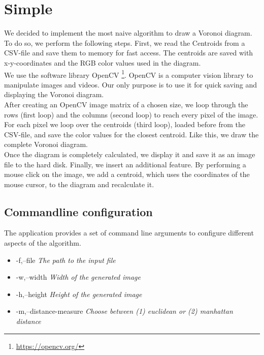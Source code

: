 \section{Simple}

We decided to implement the most naive algorithm to draw a Voronoi diagram.
To do so, we perform the following steps.
First, we read the Centroids from a CSV-file and save them to memory for fast access. The centroids are saved with x-y-coordinates and the RGB color values used in the diagram.\\

We use the software library OpenCV \footnote{\url{https://opencv.org/}}. OpenCV is a computer vision library to manipulate images and videos. Our only purpose is to use it for quick saving and displaying the Voronoi diagram.\\

After creating an OpenCV image matrix of a chosen size, we loop through the rows (first loop) and the columns (second loop) to reach every pixel of the image. For each pixel we loop over the centroids (third loop), loaded before from the CSV-file, and save the color values for the closest centroid. Like this, we draw the complete Voronoi diagram.\\

Once the diagram is completely calculated, we display it and save it as an image file to the hard disk. Finally, we insert an additional feature. By performing a mouse click on the image, we add a centroid, which uses the coordinates of the mouse cursor, to the diagram and recalculate it.


\subsection{Commandline configuration}

The application provides a set of command line arguments to configure different aspects of the algorithm.

\begin{itemize}
    \item -f,--file \textit{The path to the input file}
    \item -w,--width \textit{Width of the generated image}
    \item -h,--height \textit{Height of the generated image}
    \item -m,--distance-measure \textit{Choose between (1) euclidean or (2) manhattan distance}
\end{itemize}

